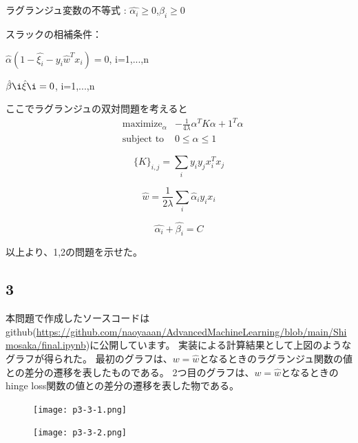 \documentclass[a4j,11pt]{jarticle}
\begin{document}
ラグランジュ変数の不等式 : $\hat{\alpha_i}\geq0$,$\hat{\beta_i}\geq0$

スラックの相補条件：
\begin{center}
    $\hat{\alpha}(1-\hat{\xi_i}-y_i\hat{w}^Tx_i) = 0$, i=1,...,n

    $\hat{\beta}\i \hat{\xi}\i = 0$, i=1,...,n
\end{center}

ここでラグランジュの双対問題を考えると
\begin{equation}
    \begin{aligned}
        & \text{maximize}_{\alpha}
            & -\frac{1}{4\lambda}\alpha^TK\alpha+1^T\alpha\\
        &\text{subject to}
            & 0\leq\alpha\leq 1
    \end{aligned}
\end{equation}

\begin{equation*}
    \{K\}_{i,j} = \sum_i y_i y_j x_i^T x_j
\end{equation*}

\begin{equation*}
    \hat{w} = \frac{1}{2\lambda}\sum_i \hat{\alpha}_i y_i x_i
\end{equation*}

\begin{equation*}
    \hat{\alpha_i} + \hat{\beta_i} = C
\end{equation*}

以上より、1,2の問題を示せた。

\subsection*{3}
本問題で作成したソースコードはgithub(\url{https://github.com/naoyaaan/AdvancedMachineLearning/blob/main/Shimosaka/final.ipynb})に公開しています。
\newpage
実装による計算結果として上図のようなグラフが得られた。
最初のグラフは、$w=\hat{w}$となるときのラグランジュ関数の値との差分の遷移を表したものである。
2つ目のグラフは、$w=\hat{w}$となるときのhinge loss関数の値との差分の遷移を表した物である。

\begin{figure}
    \centering
    \texttt{[image: p3-3-1.png]}
\end{figure}

\begin{figure}
    \centering
    \texttt{[image: p3-3-2.png]}
\end{figure}
\end{document}

